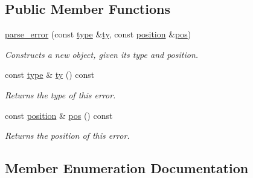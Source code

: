 \subsection*{Public Member Functions}
\begin{DoxyCompactItemize}
\item 
\hypertarget{classbfjit_1_1parse__error_a492dc45a5a66316cb51fb2b4259f674d}{}\label{classbfjit_1_1parse__error_a492dc45a5a66316cb51fb2b4259f674d} 
\hyperlink{classbfjit_1_1parse__error_a492dc45a5a66316cb51fb2b4259f674d}{parse\+\_\+error} (const \hyperlink{classbfjit_1_1parse__error_af750138d196890dcdc543c9fb1b7705b}{type} \&\hyperlink{classbfjit_1_1parse__error_ae4d7328b778c35873aefd3c76b85e38b}{ty}, const \hyperlink{classbfjit_1_1position}{position} \&\hyperlink{classbfjit_1_1parse__error_a5dd50c33cba31daa171f2809231c2fd2}{pos})
\begin{DoxyCompactList}\small\item\em Constructs a new object, given its type and position. \end{DoxyCompactList}\item 
\hypertarget{classbfjit_1_1parse__error_ae4d7328b778c35873aefd3c76b85e38b}{}\label{classbfjit_1_1parse__error_ae4d7328b778c35873aefd3c76b85e38b} 
const \hyperlink{classbfjit_1_1parse__error_af750138d196890dcdc543c9fb1b7705b}{type} \& \hyperlink{classbfjit_1_1parse__error_ae4d7328b778c35873aefd3c76b85e38b}{ty} () const
\begin{DoxyCompactList}\small\item\em Returns the type of this error. \end{DoxyCompactList}\item 
\hypertarget{classbfjit_1_1parse__error_a5dd50c33cba31daa171f2809231c2fd2}{}\label{classbfjit_1_1parse__error_a5dd50c33cba31daa171f2809231c2fd2} 
const \hyperlink{classbfjit_1_1position}{position} \& \hyperlink{classbfjit_1_1parse__error_a5dd50c33cba31daa171f2809231c2fd2}{pos} () const
\begin{DoxyCompactList}\small\item\em Returns the position of this error. \end{DoxyCompactList}\end{DoxyCompactItemize}


\subsection{Member Enumeration Documentation}
\hypertarget{classbfjit_1_1parse__error_af750138d196890dcdc543c9fb1b7705b}{}\label{classbfjit_1_1parse__error_af750138d196890dcdc543c9fb1b7705b} 
